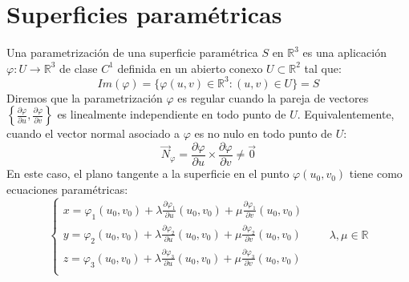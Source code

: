 \section{Superficies paramétricas}

\begin{definición} 
Una  parametrización de una superficie paramétrica $S$ en $\mathbb{R}^3$ es una aplicación $\varphi: U \to \mathbb{R}^3$ de clase $C^1$ definida en un abierto conexo $U \subset \mathbb{R}^2$ tal que:
$$ Im(\varphi) = \{ \varphi(u,v) \in \mathbb{R}^3 : (u,v) \in U \} = S $$
Diremos que la parametrización $\varphi$ es regular cuando la pareja de vectores $\left\{\frac{\partial \varphi}{\partial u}, \frac{\partial \varphi}{\partial v}\right\}$ es linealmente independiente en todo punto de $U$. Equivalentemente, cuando el vector normal asociado a $\varphi$ es no nulo en todo punto de $U$:
$$ \vec{N}_{\varphi} = \frac{\partial \varphi}{\partial u} \times \frac{\partial \varphi}{\partial v} \neq \vec{0} $$
En este caso, el plano tangente a la superficie en el punto $\varphi(u_0,v_0)$ tiene como ecuaciones paramétricas:
$$
    \begin{cases}
        x = \varphi_1(u_0,v_0) + \lambda \frac{\partial \varphi_1}{\partial u}(u_0,v_0) + \mu \frac{\partial \varphi_1}{\partial v}(u_0,v_0) \\
        y = \varphi_2(u_0,v_0) + \lambda \frac{\partial \varphi_2}{\partial u}(u_0,v_0) + \mu \frac{\partial \varphi_2}{\partial v}(u_0,v_0) \\
        z = \varphi_3(u_0,v_0) + \lambda \frac{\partial \varphi_3}{\partial u}(u_0,v_0) + \mu \frac{\partial \varphi_3}{\partial v}(u_0,v_0) \\
    \end{cases} \qquad \lambda, \mu \in \mathbb{R}
$$
\end{definición}



